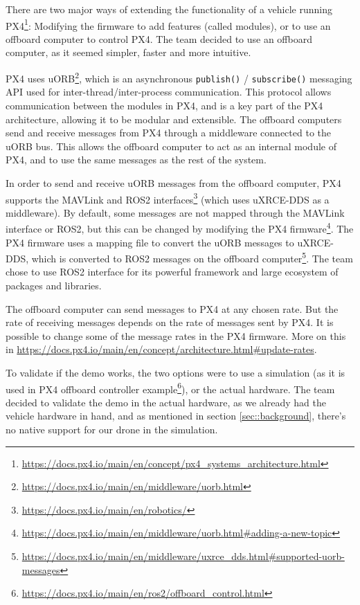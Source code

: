 \documentclass[a4paper]{article}
\begin{document}
There are two major ways of extending the functionality of a vehicle running PX4\footnote{\url{https://docs.px4.io/main/en/concept/px4_systems_architecture.html}}: Modifying the firmware to add features (called modules), or to use an offboard computer to control PX4. 
The team decided to use an offboard computer, as it seemed simpler, faster and more intuitive. 

PX4 uses uORB\footnote{\url{https://docs.px4.io/main/en/middleware/uorb.html}}, which is an asynchronous \verb|publish()| / \verb|subscribe()| messaging API used for inter-thread/inter-process communication. 
This protocol allows communication between the modules in PX4, and is a key part of the PX4 architecture, allowing it to be modular and extensible. 
The offboard computers send and receive messages from PX4 through a middleware connected to the uORB bus. 
This allows the offboard computer to act as an internal module of PX4, and to use the same messages as the rest of the system. 

In order to send and receive uORB messages from the offboard computer, PX4 supports the MAVLink and ROS2 interfaces\footnote{\url{https://docs.px4.io/main/en/robotics/}} (which uses uXRCE-DDS as a middleware). 
By default, some messages are not mapped through the MAVLink interface or ROS2, but this can be changed by modifying the PX4 firmware\footnote{\url{https://docs.px4.io/main/en/middleware/uorb.html\#adding-a-new-topic}}. 
The PX4 firmware uses a mapping file to convert the uORB messages to uXRCE-DDS, which is converted to ROS2 messages on the offboard computer\footnote{\url{https://docs.px4.io/main/en/middleware/uxrce_dds.html\#supported-uorb-messages}}. 
The team chose to use ROS2 interface for its powerful framework and large ecosystem of packages and libraries. 

The offboard computer can send messages to PX4 at any chosen rate. But the rate of receiving messages depends on the rate of messages sent by PX4. 
It is possible to change some of the message rates in the PX4 firmware. 
More on this in \url{https://docs.px4.io/main/en/concept/architecture.html\#update-rates}. 

To validate if the demo works, the two options were to use a simulation (as it is used in PX4 offboard controller example\footnote{\url{https://docs.px4.io/main/en/ros2/offboard_control.html}}), or the actual hardware. 
The team decided to validate the demo in the actual hardware, as we already had the vehicle hardware in hand, and as mentioned in section \ref{sec::background}, there's no native support for our drone in the simulation. 
\end{document}

